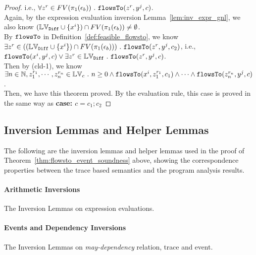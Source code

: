 \begin{proof}
i.e., $\forall z^r \in FV(\pi_1(\mathtt{\epsilon}_b)) ~.~ \mathtt{flowsTo}(z^r, y^j, c)$.
\\
Again, by the expression evaluation inversion Lemma~\ref{lem:inv_expr_gnl}, we also know 
$(\mathbb{LV}_{\mathtt{Diff}} \cup \{x^i\} )\cap FV(\pi_1(\mathtt{\epsilon}_b)) \neq \emptyset$.
\\
By $\mathtt{flowsTo}$ in Definition~\ref{def:feasible_flowsto}, 
we know $
\exists z^r \in ((\mathbb{LV}_{\mathtt{Diff}} \cup \{x^i\} ) \cap FV(\pi_1(\mathtt{\epsilon}_b)))~.~ \mathtt{flowsTo}(z^r, y^j, c_2)$, i.e., 
\\
$\mathtt{flowsTo}(x^i, y^j, c) \lor 
\exists z^r \in \mathbb{LV}_{\mathtt{Diff}} ~.~ \mathtt{flowsTo}(z^r, y^j, c)$.
\\
Then by (cld-1),
we know 
\\
$\exists n \in \mathbb{N}, z_1^{r_1}, \cdots, z_n^{r_n} \in \mathbb{LV}_{{c}} ~.~ n \geq 0 \land
\mathtt{flowsTo}(x^i,  z_1^{r_1}, c_1) 
\land \cdots \land \mathtt{flowsTo}(z_n^{r_n}, y^j, c)$.
\\
  Then, we have this theorem proved.
  By the evaluation rule, this case is proved in the same way as \textbf{case: $c = c_1; c_2$}
\end{proof}

\subsection{Inversion Lemmas and Helper Lemmas}
The following are the inversion lemmas and helper lemmas used in the proof of Theorem~\ref{thm:flowsto_event_soundness} above,
showing the correspondence properties between the trace based semantics and the program analysis results.
\paragraph*{Arithmetic Inversions}
The Inversion Lemmas on expression evaluations.

\paragraph*{Events and Dependency Inversions}
The Inversion Lemmas on \emph{may-dependency} relation, trace and event.
